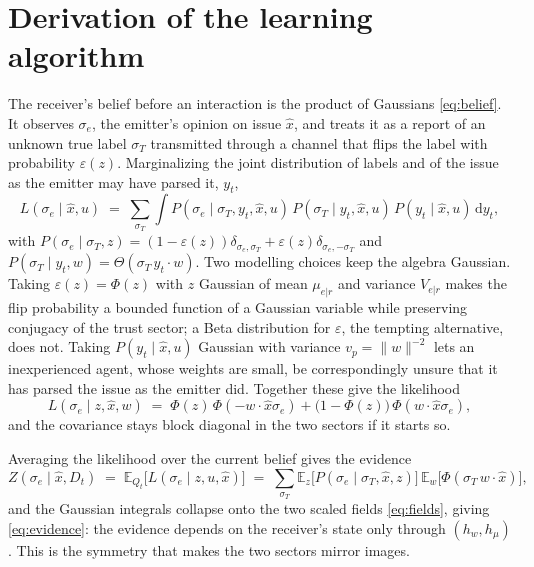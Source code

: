 \documentclass{article}
\newcommand{\hw}{h_{w}}
\newcommand{\hmu}{h_{\mu}}
\begin{document}
\section{Derivation of the learning algorithm}
\label{app:derivation}

The receiver's belief before an interaction is the product of Gaussians
\eqref{eq:belief}. It observes $\sigma_e$, the emitter's opinion on issue
$\hat{x}$, and treats it as a report of an unknown true label $\sigma_T$
transmitted through a channel that flips the label with probability
$\varepsilon(z)$. Marginalizing the joint distribution of labels and of the issue
as the emitter may have parsed it, $y_t$,
%
\begin{equation}
  L(\sigma_e\mid \hat{x}, u) \;=\;
  \sum_{\sigma_T}\int P(\sigma_e\mid \sigma_T, y_t, \hat{x}, u)\,
  P(\sigma_T\mid y_t, \hat{x}, u)\,P(y_t\mid \hat{x}, u)\,\mathrm{d}y_t ,
\end{equation}
%
with $P(\sigma_e\mid\sigma_T,z)=(1-\varepsilon(z))\delta_{\sigma_e,\sigma_T} +
\varepsilon(z)\delta_{\sigma_e,-\sigma_T}$ and
$P(\sigma_T\mid y_t,w)=\Theta(\sigma_T\, y_t\cdot w)$. Two modelling choices keep
the algebra Gaussian. Taking $\varepsilon(z)=\Phi(z)$ with $z$ Gaussian of mean
$\mu_{e|r}$ and variance $V_{e|r}$ makes the flip probability a bounded function
of a Gaussian variable while preserving conjugacy of the trust sector;
a Beta distribution for $\varepsilon$, the tempting alternative, does not. Taking
$P(y_t\mid \hat{x},u)$ Gaussian with variance $v_p=\|w\|^{-2}$ lets an
inexperienced agent, whose weights are small, be correspondingly unsure that it
has parsed the issue as the emitter did. Together these give the likelihood
%
\begin{equation}
  L(\sigma_e\mid z, \hat{x}, w) \;=\;
  \Phi(z)\,\Phi(-w\cdot\hat{x}\sigma_e)
  + \bigl(1-\Phi(z)\bigr)\,\Phi(w\cdot\hat{x}\sigma_e),
  \label{eq:likelihood}
\end{equation}
%
and the covariance stays block diagonal in the two sectors if it starts so.

Averaging the likelihood over the current belief gives the evidence
%
\begin{equation}
  Z(\sigma_e\mid \hat{x}, D_t) \;=\; \mathbb{E}_{Q_t}\bigl[L(\sigma_e\mid z, u, \hat{x})\bigr]
  \;=\;\sum_{\sigma_T}\mathbb{E}_z\bigl[P(\sigma_e\mid\sigma_T,\hat{x},z)\bigr]\,
  \mathbb{E}_w\bigl[\Phi(\sigma_T\, w\cdot\hat{x})\bigr],
\end{equation}
%
and the Gaussian integrals collapse onto the two scaled fields
\eqref{eq:fields}, giving \eqref{eq:evidence}: the evidence depends on the
receiver's state only through $(\hw,\hmu)$. This is the symmetry that makes the
two sectors mirror images.
\end{document}
